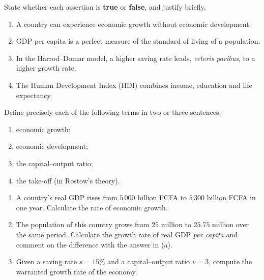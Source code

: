 \documentclass[11pt]{article}
\newcounter{popsec}
\newcounter{popsub}
\newcommand{\courssub}[1]{%
  \stepcounter{popsub}%
  \par\vspace{9pt}\noindent{\popxbold\fontsize{11.5}{13}\selectfont\color{popink}{\color{poporange}\thepopsec.\thepopsub}\hspace{6pt}#1}\par\nopagebreak\vspace{4pt}
}
\begin{document}
\begin{exercice}
State whether each assertion is \textbf{true} or \textbf{false}, and justify briefly.
\begin{enumerate}
\item A country can experience economic growth without economic development.
\item GDP per capita is a perfect measure of the standard of living of a population.
\item In the Harrod--Domar model, a higher saving rate leads, \emph{ceteris paribus}, to a higher growth rate.
\item The Human Development Index (HDI) combines income, education and life expectancy.
\end{enumerate}
\end{exercice}

\begin{exercice}[Definitions]
Define precisely each of the following terms in two or three sentences:
\begin{enumerate}
\item economic growth;
\item economic development;
\item the capital--output ratio;
\item the take-off (in Rostow's theory).
\end{enumerate}
\end{exercice}

\begin{exercice}
\begin{enumerate}
\item A country's real GDP rises from $5\,000$ billion FCFA to $5\,300$ billion FCFA in one year. Calculate the rate of economic growth.
\item The population of this country grows from $25$ million to $25.75$ million over the same period. Calculate the growth rate of real GDP \emph{per capita} and comment on the difference with the answer in (a).
\item Given a saving rate $s = 15\%$ and a capital--output ratio $v = 3$, compute the warranted growth rate of the economy.
\end{enumerate}
\end{exercice}

\courssub{I practise}
\end{document}
